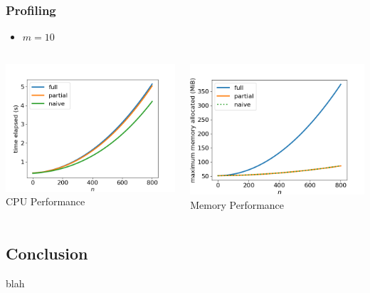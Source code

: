 \documentclass[11pt]{beamer}
\begin{document}
	\begin{frame}
		\frametitle{Profiling}
		\begin{itemize}
			\item $m=10$
		\end{itemize}
		\begin{columns}
			\begin{column}{0.5\textwidth}
				\begin{center}
					\includegraphics[width=\textwidth]{figures/cpu_profile.png}
					CPU Performance
				\end{center}
			\end{column}
			\begin{column}{0.5\textwidth}
				\begin{center}
					\includegraphics[width=\textwidth]{figures/memory_profile.png}
					Memory Performance
				\end{center}
			\end{column}
		\end{columns}
	\end{frame}

	\subsection{Conclusion}
	\begin{frame}
		blah
	\end{frame}
\end{document}
